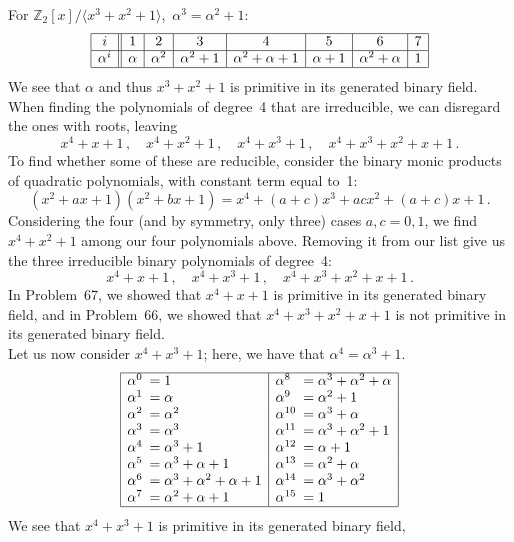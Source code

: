 \documentclass[11pt]{article}
\begin{document}
  For $\mathbb{Z}_2[x]/\langle x^3 + x^2 + 1\rangle$,\,
      $\alpha^3 = \alpha^2 + 1$:
  \[\begin{array}{|c||c|c|c|c|c|c|c|c|}\hline
           i &  1      &    2     &    3       &    4              &    5     &    6            &  7\\\hline
    \alpha^i &  \alpha & \alpha^2 & \alpha^2+1 & \alpha^2+\alpha+1 & \alpha+1 & \alpha^2+\alpha &  1\\\hline
  \end{array}\]
  We see that $\alpha$ and thus $x^3+x^2+1$ is primitive in its generated binary field.\\
  When finding the polynomials of degree~4 that are irreducible,
  we can disregard the ones with roots,
  leaving
  \[
    x^4 + x + 1\,,\quad
    x^4 + x^2 + 1\,,\quad
    x^4 + x^3 + 1\,,\quad
    x^4 + x^3 + x^2 + x + 1\,.
  \]
  To find whether some of these are reducible,
  consider the binary monic products of quadratic polynomials, with constant term equal to~1:
  \[
      (x^2+ax+1)(x^2+bx+1)
    = x^4 + (a+c)x^3 + acx^2 + (a+c)x + 1\,.
  \]
  Considering the four (and by symmetry, only three) cases $a,c = 0,1$,
  we find $x^4 + x^2 + 1$ among our four polynomials above.
  Removing it from our list give us the three irreducible binary polynomials of degree~4:
  \[
    x^4 + x + 1\,,\quad
    x^4 + x^3 + 1\,,\quad
    x^4 + x^3 + x^2 + x + 1\,.
  \]
  In Problem~67, we showed that $x^4 + x + 1$ is primitive in its generated binary field,
  and in Problem~66, we showed that $x^4 + x^3 + x^2 + x + 1$ is not primitive in its generated binary field.\\
  Let us now consider $x^4 + x^3 + 1$;
  here, we have that $\alpha^4 = \alpha^3 + 1$.
  \[\begin{array}{|ll|ll|}\hline\begin{picture}(0,0)(0,.7)\end{picture}
    \alpha^0 \!\!\!&= 1                                & \alpha^8   \!\!\!&= \alpha^3 + \alpha^2 + \alpha \\
    \alpha^1 \!\!\!&= \alpha                           & \alpha^9   \!\!\!&= \alpha^2 + 1\\
    \alpha^2 \!\!\!&= \alpha^2                         & \alpha^{10}\!\!\!&= \alpha^3 + \alpha\\
    \alpha^3 \!\!\!&= \alpha^3                         & \alpha^{11}\!\!\!&= \alpha^3 + \alpha^2 + 1\\
    \alpha^4 \!\!\!&= \alpha^3 + 1                     & \alpha^{12}\!\!\!&= \alpha   + 1\\
    \alpha^5 \!\!\!&= \alpha^3 + \alpha +1             & \alpha^{13}\!\!\!&= \alpha^2 + \alpha\\
    \alpha^6 \!\!\!&= \alpha^3 + \alpha^2 + \alpha + 1 & \alpha^{14}\!\!\!&= \alpha^3 + \alpha^2\\
    \alpha^7 \!\!\!&= \alpha^2 + \alpha + 1            & \alpha^{15}\!\!\!&= 1\\\hline
  \end{array}\]
  We see that $x^4 + x^3 + 1$ is primitive in its generated binary field,
\end{document}
